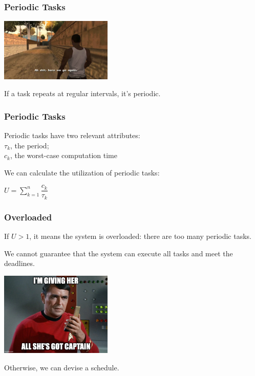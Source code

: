 \begin{frame}
\frametitle{Periodic Tasks}

\begin{center}
	\includegraphics[width=0.4\textwidth]{images/periodic.jpg}
\end{center}

If a task repeats at regular intervals, it's \alert{periodic}.

\end{frame}

\begin{frame}
\frametitle{Periodic Tasks}

Periodic tasks have two relevant attributes:\\
\quad $\tau_{k}$, the period; \\
\quad $c_{k}$, the worst-case computation time

We can calculate the utilization of periodic tasks:

\begin{center}
$U = \sum\limits_{k=1}^n\dfrac{c_{k}}{\tau_{k}}$
\end{center}

\end{frame}

\begin{frame}
\frametitle{Overloaded}

If $U > 1$, it means the system is overloaded: there are too many periodic tasks. 

We cannot guarantee that the system can execute all tasks and meet the deadlines.

\begin{center}
	\includegraphics[width=0.4\textwidth]{images/allshesgot.jpg}
\end{center}

Otherwise, we can devise a schedule.

\end{frame}

